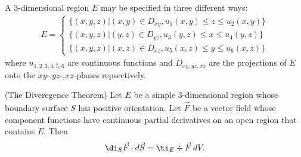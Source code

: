 \documentclass{article}
\begin{document}
\begin{definition}
    A  3-dimensional region $E$ may be specified in three different ways:
    \begin{align*}
        E=\begin{cases}
            \{(x,y,z)|(x,y)\in D_{xy}, u_1(x,y)\leq z \leq u_2(x,y)\}\\
            \{(x,y,z)|(y,z)\in D_{yz}, u_3(y,z)\leq x \leq u_4(y,z)\}\\
            \{(x,y,z)|(x,z)\in D_{xz}, u_5(x,z)\leq y \leq u_6(x,z)\}
        \end{cases}
    \end{align*}
    where $u_{1,2,3,4,5,6}$ are continuous functions and $D_{xy,yz,xz}$ are the projections
    of $E$ onto the $xy$-,$yz$-,$xz$-planes repsectively.
\end{definition}
\begin{theorem}(The Diveregence Theorem)
    Let $E$ be a simple 3-dimensional region whose boundary surface $S$ has positive
    orientation. Let $\vec F$ be a vector field whose component functions have continuous
    partial derivatives on an open region that contains $E$. Then
    \begin{align*}
        \di_S \vec F\cdot d\vec S = \ti_E \div\vec F\:dV.
    \end{align*}
\end{theorem}
\end{document}

